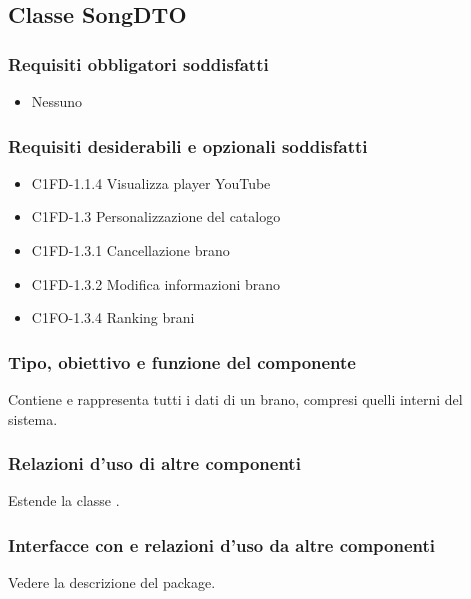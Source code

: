 \subsection{Classe SongDTO}
\subsubsection*{Requisiti obbligatori soddisfatti}
\begin{itemize}
    \item Nessuno
\end{itemize}
\subsubsection*{Requisiti desiderabili e opzionali soddisfatti}
\begin{itemize}
    \item C1FD-1.1.4 Visualizza player YouTube
    \item C1FD-1.3 Personalizzazione del catalogo
    \item C1FD-1.3.1 Cancellazione brano
    \item C1FD-1.3.2 Modifica informazioni brano
    \item C1FO-1.3.4 Ranking brani
\end{itemize}
\subsubsection*{Tipo, obiettivo e funzione del componente}
Contiene e rappresenta tutti i dati di un brano, compresi quelli interni del
sistema. 
\subsubsection*{Relazioni d'uso di altre componenti}
Estende la classe .
\subsubsection*{Interfacce con e relazioni d'uso da altre componenti}
Vedere la descrizione del package.
